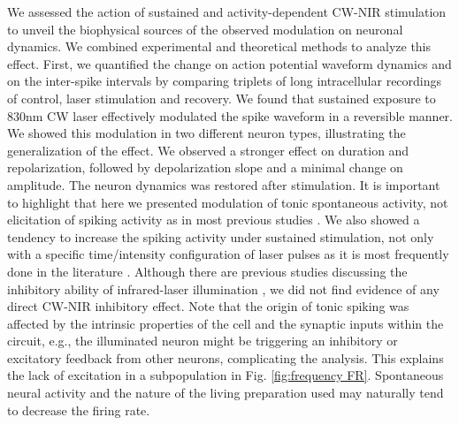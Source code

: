We assessed the action of sustained and activity-dependent CW-NIR stimulation to unveil the biophysical sources of the observed modulation on neuronal dynamics. We combined experimental and theoretical methods to analyze this effect. First, we quantified the change on action potential waveform dynamics and on the inter-spike intervals by comparing triplets of long intracellular recordings of control, laser stimulation and recovery. We found that sustained exposure to 830nm CW laser effectively modulated the spike waveform in a reversible manner. We showed this modulation in two different neuron types, illustrating the generalization of the effect. We observed a stronger effect on duration and repolarization, followed by depolarization slope and a minimal change on amplitude. The neuron dynamics was restored after stimulation. It is important to highlight that here we presented modulation of tonic spontaneous activity, not elicitation of spiking activity as in most previous studies \parencite{Wells2005,Izzo2007,Shapiro2012,Rabbitt2016}. We also showed a tendency to increase the spiking activity under sustained stimulation, not only with a specific time/intensity configuration of laser pulses as it is most frequently done in the literature \parencite{izzo_optical_2007,goyal_acute_2012,beier_plasma_2014,pan_infrared_2023}. Although there are previous studies discussing the inhibitory ability of infrared-laser illumination \parencite{duke_transient_2013,lothet_selective_2017,ganguly_thermal_2019, begeng_activity_2022}, we did not find evidence of any direct CW-NIR inhibitory effect. Note that the origin of tonic spiking was affected by the intrinsic properties of the cell and the synaptic inputs within the circuit, e.g., the illuminated neuron might be triggering an inhibitory or excitatory feedback from other neurons, complicating the analysis. This explains the lack of excitation in a subpopulation in Fig. \ref{fig:frequency FR}. Spontaneous neural activity and the nature of the living preparation used may naturally tend to decrease the firing rate.

